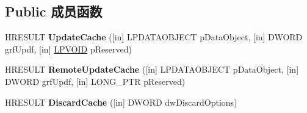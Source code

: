 \subsection*{Public 成员函数}
\begin{DoxyCompactItemize}
\item 
\mbox{\label{interface_i_ole_cache2_ac61102e4be65f64416b74303267212a7}} 
H\+R\+E\+S\+U\+LT {\bfseries Update\+Cache} (\mbox{[}in\mbox{]} L\+P\+D\+A\+T\+A\+O\+B\+J\+E\+CT p\+Data\+Object, \mbox{[}in\mbox{]} D\+W\+O\+RD grf\+Updf, \mbox{[}in\mbox{]} \hyperlink{interfacevoid}{L\+P\+V\+O\+ID} p\+Reserved)
\item 
\mbox{\label{interface_i_ole_cache2_aa4a5bb687e5365dcc80907689933c403}} 
H\+R\+E\+S\+U\+LT {\bfseries Remote\+Update\+Cache} (\mbox{[}in\mbox{]} L\+P\+D\+A\+T\+A\+O\+B\+J\+E\+CT p\+Data\+Object, \mbox{[}in\mbox{]} D\+W\+O\+RD grf\+Updf, \mbox{[}in\mbox{]} L\+O\+N\+G\+\_\+\+P\+TR p\+Reserved)
\item 
\mbox{\label{interface_i_ole_cache2_ac83138576d1f992cb0e85a1bd6ad8f2f}} 
H\+R\+E\+S\+U\+LT {\bfseries Discard\+Cache} (\mbox{[}in\mbox{]} D\+W\+O\+RD dw\+Discard\+Options)
\end{DoxyCompactItemize}
